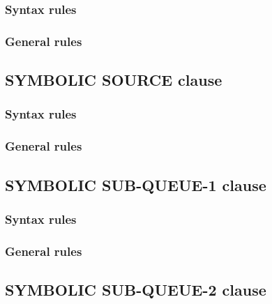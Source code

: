\subsubsection{Syntax rules}

\subsubsection{General rules}

\subsection{SYMBOLIC SOURCE clause}

\begin{syntax}[\deletedcolour]
\end{syntax}

\subsubsection{Syntax rules}

\subsubsection{General rules}

\subsection{SYMBOLIC SUB-QUEUE-1 clause}

\begin{syntax}[\deletedcolour]
\end{syntax}

\subsubsection{Syntax rules}

\subsubsection{General rules}

\subsection{SYMBOLIC SUB-QUEUE-2 clause}

\begin{syntax}[\deletedcolour]
\end{syntax}

